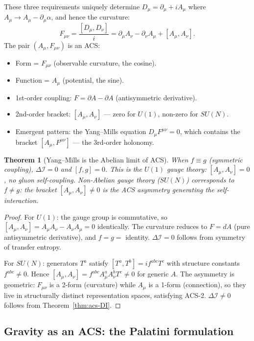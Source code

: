 \documentclass[12pt,a4paper]{article}
\theoremstyle{plain}
\newtheorem{theorem}{Theorem}[section]
\theoremstyle{definition}
\theoremstyle{remark}
\newcommand{\DI}{\Delta\mathcal{I}}
\begin{document}
These three requirements uniquely determine $D_\mu = \partial_\mu + iA_\mu$
where $A_\mu \to A_\mu - \partial_\mu\alpha$, and hence the curvature:
\begin{equation}
  F_{\mu\nu} = \frac{[D_\mu, D_\nu]}{i} = \partial_\mu A_\nu - \partial_\nu A_\mu + [A_\mu, A_\nu].
\end{equation}
The pair $(A_\mu, F_{\mu\nu})$ is an ACS:
\begin{itemize}[noitemsep]
  \item Form = $F_{\mu\nu}$ (observable curvature, the cosine).
  \item Function = $A_\mu$ (potential, the sine).
  \item 1st-order coupling: $F = \partial A - \partial A$ (antisymmetric derivative).
  \item 2nd-order bracket: $[A_\mu, A_\nu]$ --- zero for $U(1)$, non-zero for $SU(N)$.
  \item Emergent pattern: the Yang--Mills equation $D_\mu F^{\mu\nu} = 0$,
    which contains the bracket $[A_\mu, F^{\mu\nu}]$ --- the 3rd-order holonomy.
\end{itemize}

\begin{theorem}[Yang--Mills is the Abelian limit of ACS]\label{thm:YM-abelian}
When $f \equiv g$ (symmetric coupling), $\DI = 0$ and $[f,g] = 0$.  
This is the $U(1)$ gauge theory: $[A_\mu, A_\nu] = 0$, no gluon self-coupling.
Non-Abelian gauge theory ($SU(N)$) corresponds to $f \neq g$: the bracket 
$[A_\mu, A_\nu] \neq 0$ is the ACS asymmetry generating the self-interaction.
\end{theorem}

\begin{proof}
For $U(1)$: the gauge group is commutative, so $[A_\mu, A_\nu] = A_\mu A_\nu - A_\nu A_\mu = 0$ 
identically.  The curvature reduces to $F = dA$ (pure antisymmetric derivative), 
and $f = g = $ identity.  $\DI = 0$ follows from symmetry of transfer entropy.

For $SU(N)$: generators $T^a$ satisfy $[T^a, T^b] = if^{abc}T^c$ with 
structure constants $f^{abc} \neq 0$.  Hence $[A_\mu, A_\nu] = f^{abc}A^a_\mu A^b_\nu T^c \neq 0$ 
for generic $A$.  The asymmetry is geometric: $F_{\mu\nu}$ is a 2-form 
(curvature) while $A_\mu$ is a 1-form (connection), so they live in 
structurally distinct representation spaces, satisfying ACS-2.  
$\DI \neq 0$ follows from Theorem~\ref{thm:acs-DI}.
\end{proof}

\subsection{Gravity as an ACS: the Palatini formulation}
\end{document}
